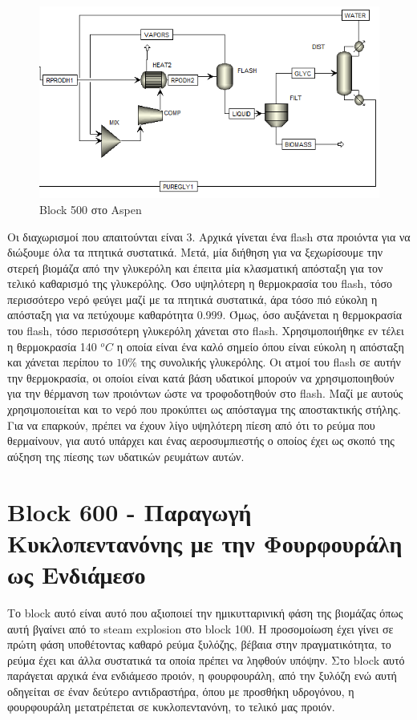 \documentclass[11pt]{article}
\begin{document}
\begin{figure}[htbp]
\centering
\includegraphics[width=.9\linewidth]{Block_500_-_Καθαρισμός_Γλυκερόλης/2023-01-10_19-09-31_screenshot.png}
\caption{Block 500 στο Aspen}
\end{figure}

Οι διαχωρισμοί που απαιτούνται είναι 3. Αρχικά γίνεται ένα flash στα προιόντα για να διώξουμε όλα τα πτητικά συστατικά. Μετά, μία διήθηση για να ξεχωρίσουμε την στερεή βιομάζα από την γλυκερόλη και έπειτα μία κλασματική απόσταξη για τον τελικό καθαρισμό της γλυκερόλης. Όσο υψηλότερη η θερμοκρασία του flash, τόσο περισσότερο νερό φεύγει μαζί με τα πτητικά συστατικά, άρα τόσο πιό εύκολη η απόσταξη για να πετύχουμε καθαρότητα 0.999. Όμως, όσο αυξάνεται η θερμοκρασία του flash, τόσο περισσότερη γλυκερόλη χάνεται στο flash. Χρησιμοποιήθηκε εν τέλει η θερμοκρασία 140 \(^oC\) η οποία είναι ένα καλό σημείο όπου είναι εύκολη η απόσταξη και χάνεται περίπου το \(10 \%\) της συνολικής γλυκερόλης. Οι ατμοί του flash σε αυτήν την θερμοκρασία, οι οποίοι είναι κατά βάση υδατικοί μπορούν να χρησιμοποιηθούν για την θέρμανση των προιόντων ώστε να τροφοδοτηθούν στο flash. Μαζί με αυτούς χρησιμοποιείται και το νερό που προκύπτει ως απόσταγμα της αποστακτικής στήλης. Για να επαρκούν, πρέπει να έχουν λίγο υψηλότερη πίεση από ότι το ρεύμα που θερμαίνουν, για αυτό υπάρχει και ένας αεροσυμπιεστής ο οποίος έχει ως σκοπό της αύξηση της πίεσης των υδατικών ρευμάτων αυτών.

\section{Block 600 - Παραγωγή Κυκλοπεντανόνης με την Φουρφουράλη ως Ενδιάμεσο}
\label{sec:org86d7d93}
Το block αυτό είναι αυτό που αξιοποιεί την ημικυτταρινική φάση της βιομάζας όπως αυτή βγαίνει από το steam explosion στο block 100. Η προσομοίωση έχει γίνει σε πρώτη φάση υποθέτοντας καθαρό ρεύμα ξυλόζης, βέβαια στην πραγματικότητα, το ρεύμα έχει και άλλα συστατικά τα οποία πρέπει να ληφθούν υπόψην. Στο block αυτό παράγεται αρχικά ένα ενδιάμεσο προιόν, η φουρφουράλη, από την ξυλόζη ενώ αυτή οδηγείται σε έναν δεύτερο αντιδραστήρα, όπου με προσθήκη υδρογόνου, η φουρφουράλη μετατρέπεται σε κυκλοπεντανόνη, το τελικό μας προιόν.
\end{document}
